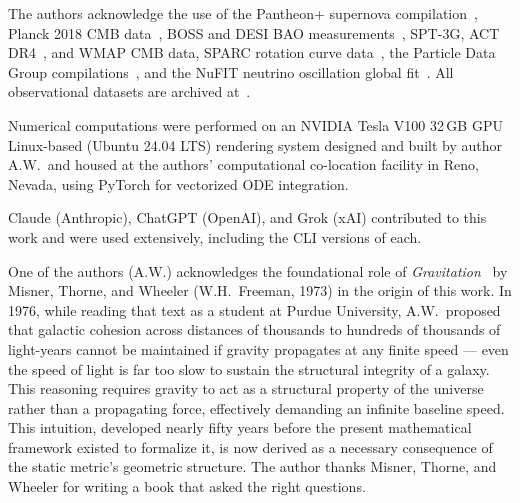 \documentclass[aps,prd,twocolumn,superscriptaddress,nofootinbib,longbibliography]{revtex4-2}
\begin{document}
\begin{acknowledgments}
The authors acknowledge the use of the Pantheon+ supernova
compilation~\cite{Pantheon2022}, Planck 2018 CMB
data~\cite{Planck2018}, BOSS and DESI BAO
measurements~\cite{DESI2024}, SPT-3G, ACT DR4~\cite{ACT2020}, and WMAP CMB data,
SPARC rotation curve data~\cite{SPARC2016}, the Particle Data Group
compilations~\cite{PDG2024}, and the NuFIT neutrino oscillation
global fit~\cite{NuFIT}.  All observational datasets are archived
at~\cite{zenodo_data2026}.

Numerical computations were performed on an NVIDIA Tesla V100 32\,GB
GPU Linux-based (Ubuntu 24.04 LTS) rendering system designed and built
by author A.W.\ and housed at the authors' computational co-location
facility in Reno, Nevada, using PyTorch for vectorized ODE
integration.

Claude (Anthropic), ChatGPT (OpenAI), and Grok (xAI) contributed to
this work and were used extensively, including the CLI versions of
each.

One of the authors (A.W.) acknowledges the foundational role of
\textit{Gravitation}~\cite{MTW1973} by Misner, Thorne, and Wheeler (W.H.\ Freeman,
1973) in the origin of this work.  In 1976, while reading that text as
a student at Purdue University, A.W.\ proposed that galactic cohesion
across distances of thousands to hundreds of thousands of light-years
cannot be maintained if gravity propagates at any finite speed ---
even the speed of light is far too slow to sustain the structural
integrity of a galaxy.  This reasoning requires gravity to act as a
structural property of the universe rather than a propagating force,
effectively demanding an infinite baseline speed.  This intuition,
developed nearly fifty years before the present mathematical framework
existed to formalize it, is now derived as a necessary consequence of
the static metric's geometric structure.  The author thanks Misner,
Thorne, and Wheeler for writing a book that asked the right questions.


\end{acknowledgments}
\end{document}
